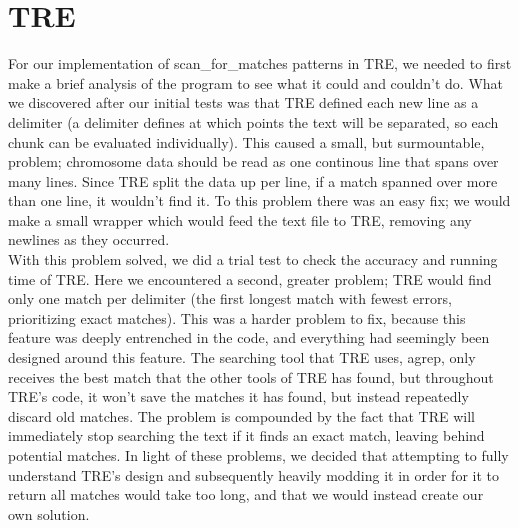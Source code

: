 \section{TRE}
  
For our implementation of scan\_for\_matches patterns in TRE, we needed to 
first make a brief analysis of the program to see what it could and couldn't 
do. What we discovered after our initial tests was that TRE defined each 
new line as a delimiter (a delimiter defines at which points the text will be 
separated, so each chunk can be evaluated individually). 
This caused a small, but surmountable, problem; chromosome data 
should be read as one continous line that spans over many lines. Since TRE 
split the data up per line, if a match spanned over more than one line, it 
wouldn't find it. To this problem there was an easy fix; we would make a small 
wrapper which would feed the text file to TRE, removing any newlines as they 
occurred.\\
With this problem solved, we did a trial test to check the accuracy and 
running time of TRE. Here we encountered a second, greater problem; TRE 
would find only one match per delimiter (the first longest match with fewest 
errors, prioritizing exact matches). This was a harder problem to fix, because this feature was 
deeply entrenched in the code, and everything had seemingly been designed 
around this feature. The searching tool that TRE uses, agrep, only receives 
the best match that the other tools of TRE has found, but throughout TRE's 
code, it won't save the matches it has found, but instead repeatedly discard old 
matches. The problem is compounded by the fact that TRE will immediately stop searching the 
text if it finds an exact match, leaving behind potential matches. In light of 
these problems, we decided that attempting to fully understand TRE's design and 
subsequently heavily modding it in order for it to return all matches would 
take too long, and that we would instead create our own solution.

